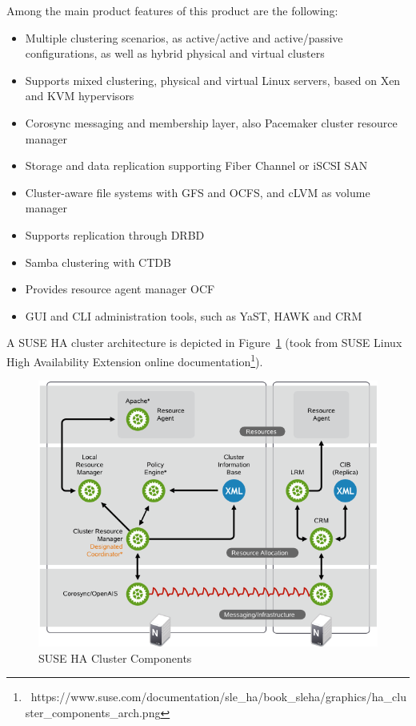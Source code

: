 \documentclass[a4paper, 12pt]{book}
\begin{document}
\noindent Among the main product features of this product are the following:

\begin{itemize}
	\item Multiple clustering scenarios, as active/active and active/passive configurations, as well as hybrid physical and virtual clusters
	\item Supports mixed clustering, physical and virtual Linux servers, based on Xen and KVM hypervisors
	\item Corosync messaging and membership layer, also Pacemaker cluster resource manager
	\item Storage and data replication supporting Fiber Channel or iSCSI SAN
	\item Cluster-aware file systems with GFS and OCFS, and cLVM as volume manager
	\item Supports replication through DRBD
	\item Samba clustering with CTDB
	\item Provides resource agent manager OCF
	\item GUI and CLI administration tools, such as YaST, HAWK and CRM
\end{itemize}

\noindent A SUSE HA cluster architecture is depicted in Figure~\ref{fig:suseha} (took from SUSE Linux High Availability Extension online documentation\footnote{{\tiny\ https://www.suse.com/documentation/sle\_ha/book\_sleha/graphics/ha\_cluster\_components\_arch.png}}).

\begin{figure}[H]
  \centering
  \includegraphics[scale=0.50]{suse-ha.png}
  \caption[SUSE HA Cluster Components]{SUSE HA Cluster Components}
  \label{fig:suseha}
\end{figure}
\end{document}
